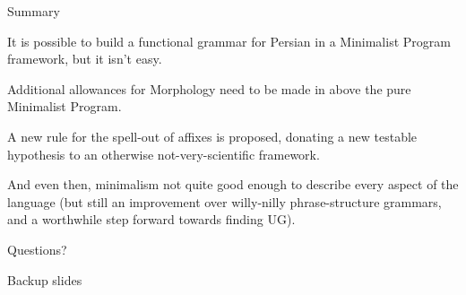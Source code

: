 \documentclass[10pt]{beamer}
\newcommand{\themename}{\textbf{\textsc{metropolis}}\xspace}
\begin{document}
\begin{frame}{Summary}

  It is possible to build a functional grammar for Persian in a Minimalist Program framework, but it isn't easy.

  Additional allowances for Morphology need to be made in above the pure Minimalist Program.

  A new rule for the spell-out of affixes is proposed, donating a new testable hypothesis to an otherwise not-very-scientific framework. 

  And even then, minimalism not quite good enough to describe every aspect of the language (but still an improvement over willy-nilly phrase-structure grammars, and a worthwhile step forward towards finding UG). 

\end{frame}

\begin{frame}[standout]
  Questions?
\end{frame}

\appendix

\begin{frame}[fragile]{Backup slides}


\end{frame}
\end{document}
